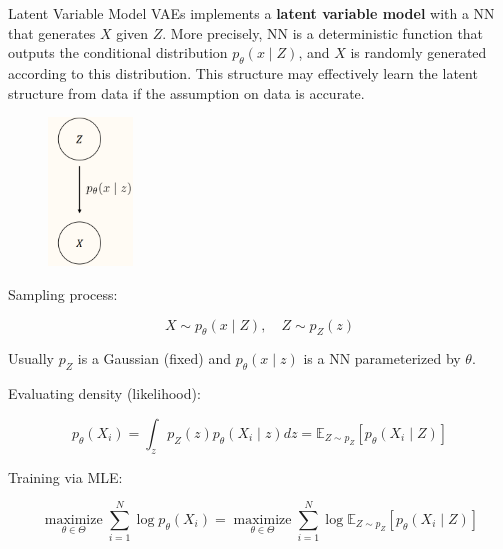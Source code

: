 \begin{frame}[allowframebreaks]

\begin{mydefinitionblock}{11.4}{Latent Variable Model}
    VAEs implements a \textbf{latent variable model} with a NN that generates $X$ given $Z$. More precisely, NN is a deterministic function that outputs the conditional distribution $p_{\theta}(x \mid Z)$, and $X$ is randomly generated according to this distribution. This structure may effectively learn the latent structure from data if the assumption on data is accurate.

    \par\noindent\textcolor{gray}{\hdashrule{\textwidth}{0.4pt}{1pt 2pt}}

    \begin{figure}[H]
        \centering
        \includegraphics[width=0.2\textwidth]{.././assets/11.2.png}
    \end{figure}

    Sampling process:

    $$
    X \sim p_{\theta}(x \mid Z), \quad Z \sim p_{Z}(z)
    $$

    Usually $p_{Z}$ is a Gaussian (fixed) and $p_{\theta}(x \mid z)$ is a NN parameterized by $\theta$.

    Evaluating density (likelihood):

    $$
    p_{\theta}\left(X_{i}\right)=\int_{z} p_{Z}(z) p_{\theta}\left(X_{i} \mid z\right) d z=\mathbb{E}_{Z \sim p_{Z}}\left[p_{\theta}\left(X_{i} \mid Z\right)\right]
    $$

    Training via MLE:

    $$
    \underset{\theta \in \Theta}{\operatorname{maximize}} \sum_{i=1}^{N} \log p_{\theta}\left(X_{i}\right)=\underset{\theta \in \Theta}{\operatorname{maximize}} \sum_{i=1}^{N} \log \mathbb{E}_{Z \sim p_{Z}}\left[p_{\theta}\left(X_{i} \mid Z\right)\right]
    $$

    \par\noindent\textcolor{gray}{\hdashrule{\textwidth}{0.4pt}{1pt 2pt}}


\end{mydefinitionblock}
\end{frame}
